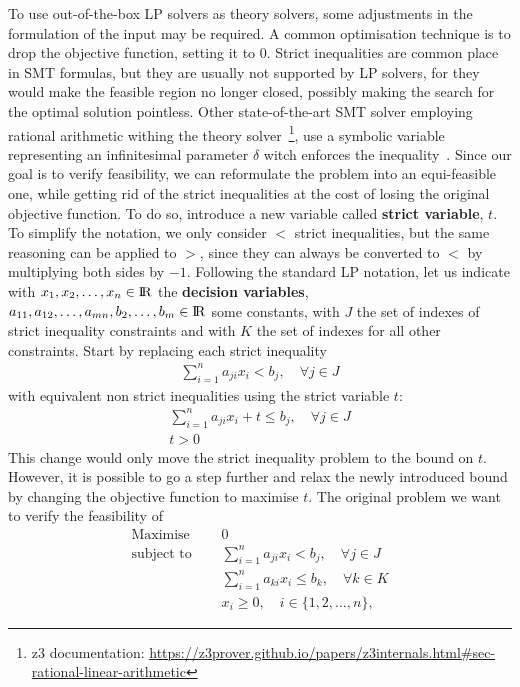 \documentclass[runningheads]{llncs}
\begin{document}
To use out-of-the-box LP solvers as theory solvers, some adjustments in the formulation of the input may be required.
A common optimisation technique is to drop the objective function, setting it to $0$.
Strict inequalities are common place in SMT formulas, but they are usually not supported by LP solvers, for they would make the feasible region no longer closed, possibly making the search for the optimal solution pointless.
Other state-of-the-art SMT solver employing rational arithmetic withing the theory solver~\footnote{z3 documentation: \url{https://z3prover.github.io/papers/z3internals.html\#sec-rational-linear-arithmetic}}, use a symbolic variable representing an infinitesimal parameter $\delta$ witch enforces the inequality~\cite{ref:lra-dpll-t}.
Since our goal is to verify feasibility, we can reformulate the problem into an equi-feasible one, while getting rid of the strict inequalities at the cost of losing the original objective function.
To do so, introduce a new variable called \textbf{strict variable}, $t$.
To simplify the notation, we only consider $<$ strict inequalities, but the same reasoning can be applied to $>$, since they can always be converted to $<$ by multiplying both sides by $-1$.
Following the standard LP notation, let us indicate with $x_1, x_2, \ldots, x_n \in {\rm I\!R}$ the \textbf{decision variables}, $a_{11}, a_{12}, \ldots, a_{mn}, b_{2}, \ldots, b_{m}\in {\rm I\!R}$ some constants, with $J$ the set of indexes of strict inequality constraints and with $K$ the set of indexes for all other constraints.
Start by replacing each strict inequality
\begin{align*}
    \sum_{i=1}^{n} a_{ji}x_{i} < b_j, \quad \forall j \in J
\end{align*}
with equivalent non strict inequalities using the strict variable $t$:
\begin{align*}
    \sum_{i=1}^{n} a_{ji}x_{i} + t \le b_j, \quad \forall j \in J \\
    t > 0
\end{align*}
This change would only move the strict inequality problem to the bound on $t$.
However, it is possible to go a step further and relax the newly introduced bound by changing the objective function to maximise $t$.
The original problem we want to verify the feasibility of
\begin{equation}
    \label{eq:lp-original}
    \begin{split}
        \text{Maximise }   \quad & 0                                                          \\
        \text{subject to } \quad & \sum_{i=1}^{n} a_{ji}x_{i} < b_j,   \quad \forall j \in J  \\
        \quad                    & \sum_{i=1}^{n} a_{ki}x_{i} \le b_k,  \quad \forall k \in K \\
                                 & x_i \ge 0,  \quad i \in \{1, 2, \ldots, n\},
    \end{split}
\end{equation}
\end{document}
